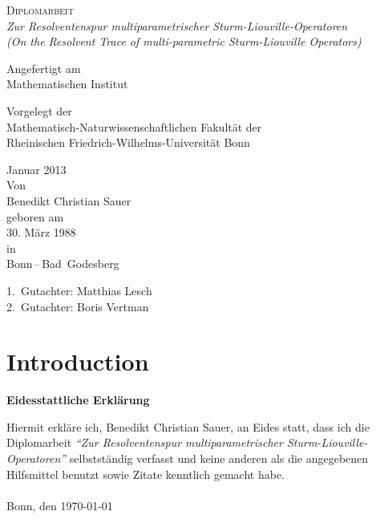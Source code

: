 \documentclass[paper=a4,twoside,parskip=full]{scrartcl}
\author{Benedikt Christian Sauer}
\title{\Thema}
\numberwithin{equation}{subsection}
\numberwithin{Corollary}{section}
\numberwithin{Lemma}{section}
\numberwithin{Theorem}{section}
\numberwithin{Remark}{section}
\newcommand{\Thema}{Zur Resolventenspur multiparametrischer
Sturm-Liouville-Operatoren}
\newcommand{\ThemaEn}{On the Resolvent Trace of multi-parametric Sturm-Liouville
Operators}
\begin{document}
\begin{titlepage}
  \begin{center}
      \textsc{Diplomarbeit} \\
      \bigskip
      \textit{\Thema} \\
      \textit{(\ThemaEn)}
  \end{center}
  \begin{center}
      Angefertigt am \\
      Mathematischen Institut
  \end{center}
  \begin{center}
      Vorgelegt der \\
      Mathematisch-Naturwissenschaftlichen Fakultät der \\
      Rheinischen Friedrich-Wilhelms-Universität Bonn
  \end{center}
  \begin{center}
      Januar 2013 \\
      \bigskip
      Von \\
      \bigskip
      Benedikt Christian Sauer \\
      \bigskip
      geboren am \\
      30. März 1988 \\
      in \\
      Bonn\,--\,Bad~Godesberg
  \end{center}
\end{titlepage}
\newpage
\tableofcontents
\vfill
\begin{center}
  \large 1.\ Gutachter: Matthias Lesch \\
  \large 2.\ Gutachter: Boris Vertman \\
\end{center}
\newpage
\section{Introduction}











\appendix
%



\newpage
{}
\pagestyle{plain}
\begin{center}
    \textbf{\large Eidesstattliche Erklärung}
\end{center}
\vspace{2cm}
Hiermit erkläre ich, Benedikt Christian Sauer, an Eides statt, dass ich die
Diplomarbeit \textit{"`\Thema"'} selbstständig verfasst und keine anderen als
die angegebenen Hilfsmittel benutzt sowie Zitate kenntlich gemacht habe. \\
\vspace{2cm} \\
Bonn, den \today
\end{document}
